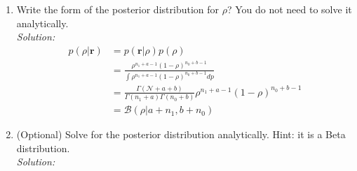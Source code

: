 \documentclass[12pt,a4paper]{article}
\begin{document}
\begin{enumerate}
  
  \item Write the form of the posterior distribution for $\rho$?  You do not need to solve it analytically. \\
	  \emph{Solution:} \\
		  \begin{align*}
		  	p(\rho\vert\textbf{r}) &= p(\textbf{r}\vert\rho)p(\rho) \\
		  	&= \frac{\rho^{n_1+a-1}(1-\rho)^{n_0+b-1}}{\int\rho^{n_1+a-1}(1-\rho)^{n_0+b-1}dp} \\
		  	&=\frac{\Gamma(\mathcal{N}+a+b)}{\Gamma(n_1+a)\Gamma(n_0+b)}\rho^{n_1+a-1}(1-\rho)^{n_0+b-1} \\
		  	&= \mathcal{B}(\rho \vert a +n_1,b + n_0)
		  \end{align*} 
  
  
  \item (Optional) Solve for the posterior distribution analytically.  Hint: it is a Beta distribution. \\
	  \emph{Solution:} \\
  
  
\end{enumerate}
\end{document}
